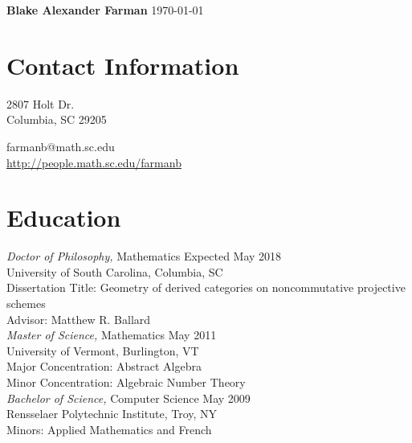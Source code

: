 \documentclass{article}
\begin{document}
\noindent\textbf{\large{Blake Alexander Farman}} \hfill \today\\
\noindent\makebox[\linewidth]{\rule{\textwidth}{0.4pt}}

\section*{Contact Information}
\begin{minipage}{1.3in}
  2807 Holt Dr.\\
  Columbia, SC 29205
\end{minipage}
\hfill
\begin{minipage}{2.15in}
  farmanb@math.sc.edu\\
  \hyperref[http://people.math.sc.edu/farmanb]{http://people.math.sc.edu/farmanb}
\end{minipage}

  
  \section*{Education} 
  \textsl{Doctor of Philosophy,} Mathematics \hfill Expected May 2018\\
  University of South Carolina, Columbia, SC\\
  Dissertation Title: Geometry of derived categories on noncommutative projective schemes\\
  Advisor: Matthew R. Ballard\\
  
  \noindent
  \textsl{Master of Science,} Mathematics \hfill May 2011\\
  University of Vermont, Burlington, VT\\
  Major Concentration: Abstract Algebra\\
  Minor Concentration: Algebraic Number Theory\\
  
  \noindent\textsl{Bachelor of Science,} Computer Science \hfill May 2009\\
  Rensselaer Polytechnic Institute, Troy, NY\\
  Minors: Applied Mathematics and French
  
\end{document}
